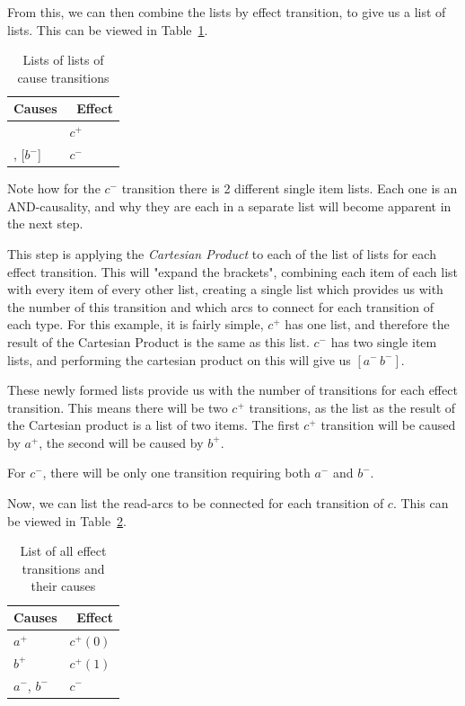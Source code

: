 \documentclass[british,conference,compsoc]{IEEEtran}
\begin{document}
\noindent From this, we can then combine the lists by effect transition, to 
give us a list of lists. This can be viewed in Table~\ref{tab:list-of-lists}.

\vspace{-1mm}

\begin{table}[h]
\caption{Lists of lists of cause transitions
		\label{tab:list-of-lists}}

  \centering
\begin{tabular}[htb]{| m{2.6cm} | m{2.0cm} |}
  \hline
Causes & \, Effect \\ \hline \hline
[$a^{+}$, $b^{+}$] & $c^{+}$ \\ \hline
[$a^{-}$], [$b^{-}$] & $c^{-}$ \\ \hline

  \end{tabular}
 \vspace{-3mm}
\end{table}

\noindent Note how for the $c^{-}$ transition there is 2 different single item 
lists. Each one is an AND-causality, and why they are each in a separate list
will become apparent in the next step. 

This step is applying the \emph{Cartesian Product} to each of the list of lists
for each effect transition. This will "expand the brackets", combining each
item of each list with every item of every other list, creating a single list 
which provides us with the number of this transition and which arcs to connect
for each transition of each type. For this example, it is fairly simple, $c^{+}$
has one list, and therefore the result of the Cartesian Product is the same as 
this list. $c^{-}$ has two single item lists, and performing the cartesian 
product on this will give us $[a^{-}\,b^{-}]$. 

These newly formed lists provide us with the number of transitions for each 
effect transition. This means there will be two $c^{+}$ transitions, as the list
as the result of the Cartesian product is a list of two items. The first 
$c^{+}$ transition will be caused by $a^{+}$, the second will be caused by 
$b^{+}$. 

For $c^{-}$, there will be only one transition requiring both $a^{-}$ and 
$b^{-}$.

Now, we can list the read-arcs to be connected for each transition of $c$.
This can be viewed in Table~\ref{tab:list-by-transition}.

\begin{table}[h]
\caption{List of all effect transitions and their causes
		\label{tab:list-by-transition}}

  \centering
\begin{tabular}[htb]{| m{2.6cm} | m{2.0cm} |}
  \hline
Causes & \, Effect \\ \hline \hline
$a^{+}$ & $c^{+}(0)$ \\ \hline
$b^{+}$ & $c^{+}(1)$ \\ \hline
$a^{-}$, $b^{-}$ & $c^{-}$ \\ \hline
  \end{tabular}
\vspace{-1mm}
\end{table}
\end{document}
